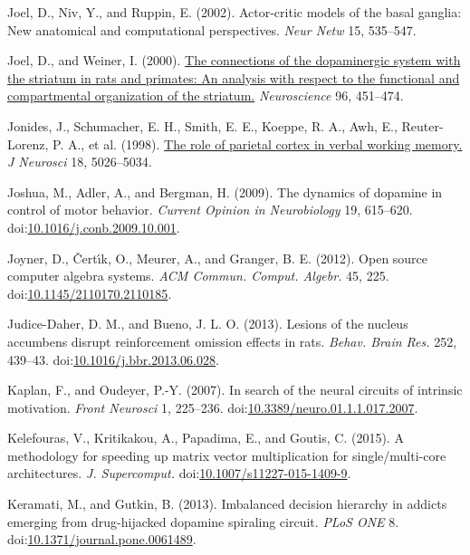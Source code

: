 \documentclass[
  11pt,
  a4paper,
]{scrbook}
\newlength{\cslhangindent}
\newenvironment{CSLReferences}[2] %
 {\begin{list}{}{%
  \setlength{\itemindent}{0pt}
  \setlength{\leftmargin}{0pt}
  \setlength{\parsep}{0pt}
  \ifodd #1
   \setlength{\leftmargin}{\cslhangindent}
   \setlength{\itemindent}{-1\cslhangindent}
  \fi
  \setlength{\itemsep}{#2\baselineskip}}}
 {\end{list}}
\begin{document}
\begin{CSLReferences}{1}{1}
Joel, D., Niv, Y., and Ruppin, E. (2002). Actor-critic models of the
basal ganglia: New anatomical and computational perspectives. \emph{Neur
Netw} 15, 535--547.

Joel, D., and Weiner, I. (2000).
\href{https://www.ncbi.nlm.nih.gov/pubmed/10717427}{The connections of
the dopaminergic system with the striatum in rats and primates: An
analysis with respect to the functional and compartmental organization
of the striatum.} \emph{Neuroscience} 96, 451--474.

Jonides, J., Schumacher, E. H., Smith, E. E., Koeppe, R. A., Awh, E.,
Reuter-Lorenz, P. A., et al. (1998).
\href{https://www.ncbi.nlm.nih.gov/pubmed/9634568}{The role of parietal
cortex in verbal working memory.} \emph{J Neurosci} 18, 5026--5034.

Joshua, M., Adler, A., and Bergman, H. (2009). The dynamics of dopamine
in control of motor behavior. \emph{Current Opinion in Neurobiology} 19,
615--620.
doi:\href{https://doi.org/10.1016/j.conb.2009.10.001}{10.1016/j.conb.2009.10.001}.

Joyner, D., Čertı́k, O., Meurer, A., and Granger, B. E. (2012). {Open
source computer algebra systems}. \emph{ACM Commun. Comput. Algebr.} 45,
225.
doi:\href{https://doi.org/10.1145/2110170.2110185}{10.1145/2110170.2110185}.

Judice-Daher, D. M., and Bueno, J. L. O. (2013). {Lesions of the nucleus
accumbens disrupt reinforcement omission effects in rats.} \emph{Behav.
Brain Res.} 252, 439--43.
doi:\href{https://doi.org/10.1016/j.bbr.2013.06.028}{10.1016/j.bbr.2013.06.028}.

Kaplan, F., and Oudeyer, P.-Y. (2007). In search of the neural circuits
of intrinsic motivation. \emph{Front Neurosci} 1, 225--236.
doi:\href{https://doi.org/10.3389/neuro.01.1.1.017.2007}{10.3389/neuro.01.1.1.017.2007}.

Kelefouras, V., Kritikakou, A., Papadima, E., and Goutis, C. (2015). {A
methodology for speeding up matrix vector multiplication for
single/multi-core architectures}. \emph{J. Supercomput.}
doi:\href{https://doi.org/10.1007/s11227-015-1409-9}{10.1007/s11227-015-1409-9}.

Keramati, M., and Gutkin, B. (2013). Imbalanced decision hierarchy in
addicts emerging from drug-hijacked dopamine spiraling circuit.
\emph{PLoS ONE} 8.
doi:\href{https://doi.org/10.1371/journal.pone.0061489}{10.1371/journal.pone.0061489}.


\end{CSLReferences}
\end{document}
